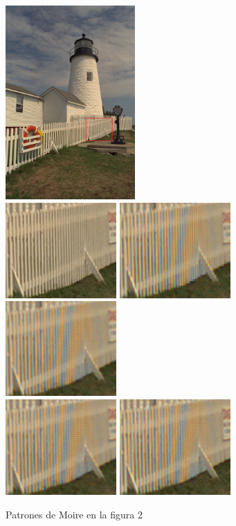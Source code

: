 \documentclass[a4paper]{article}
\begin{document}
\begin{figure}[h!]
\centering
\includegraphics[width=140pt]{img/img8-con-recuadro.png}\\
\includegraphics[width=120pt]{img/img8-recortada.png}
\includegraphics[width=120pt]{img/img8-0-recortada.png}
\includegraphics[width=120pt]{img/img8-1-recortada.png}\\
\includegraphics[width=120pt]{img/img8-2-recortada.png}
\includegraphics[width=120pt]{img/img8-3-recortada.png}
\caption{Patrones de Moire en la figura 2}
\end{figure}
\end{document}

